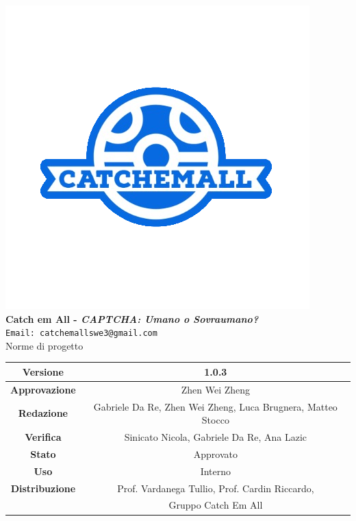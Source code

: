 \begin{titlepage}
\begin{center}
	\includegraphics[scale = 1.5]{img/logo.png}\\
	\bigskip
	\large \textbf{Catch em All - \textit{CAPTCHA: Umano o Sovraumano?}}\\
	\texttt{Email: catchemallswe3@gmail.com}\\
	\vfill
	{\fontsize{1.5cm}{0}\selectfont Norme di progetto}\\
	\vfill
	\setlength\extrarowheight{5pt}
	\begin{tabularx}{\textwidth}{| c | c |}
		\hline
		\textbf{Versione} & 1.0.3\\
		\hline
		\textbf{Approvazione} & Zhen Wei Zheng\\
		\hline
		\textbf{Redazione} & Gabriele Da Re, Zhen Wei Zheng, Luca Brugnera, Matteo Stocco\\
		\hline
		\textbf{Verifica} & Sinicato Nicola, Gabriele Da Re, Ana Lazic\\
		\hline
		\textbf{Stato} & Approvato\\
		\hline
		\textbf{Uso} & Interno\\
		\hline
		\textbf{Distribuzione} & Prof. Vardanega Tullio, Prof. Cardin Riccardo,\\
		 & Gruppo Catch Em All\\
		\hline
	\end{tabularx}
\end{center}
\end{titlepage}
